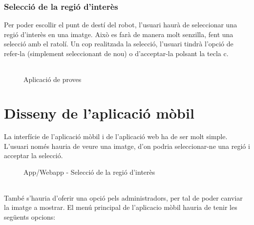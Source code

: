	\subsubsection{Selecció de la regió d'interès}
		Per poder escollir el punt de destí del robot, l'usuari haurà de seleccionar una regió d'interès en una imatge. Això es farà de manera molt senzilla, fent una selecció amb el ratolí.
		Un cop realitzada la selecció, l'usuari tindrà l'opció de refer-la (simplement seleccionant de nou) o d'acceptar-la polsant la tecla c.\\\\
		\begin{figure}[!htb]
			\caption{Aplicació de proves}
		\end{figure}
\newpage
\section{Disseny de l'aplicació mòbil}
	La interfície de l'aplicació mòbil i de l'aplicació web ha de ser molt simple. L'usuari només hauria de veure una imatge, d'on podria seleccionar-ne una regió i acceptar la selecció.\\
	\begin{figure}[H]
		\caption{App/Webapp - Selecció de la regió d'interès}
	\end{figure}
	\noindent
	\\{}
	També s'hauria d'oferir una opció pels administradors, per tal de poder canviar la imatge a mostrar. El menú principal de l'aplicacio mòbil hauria de tenir les següents opcions:
